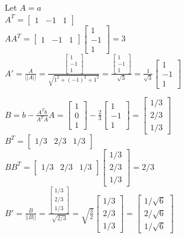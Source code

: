 \documentclass{article}
\begin{document}
\noindent
Let $A = a$\\
$A^T = \begin{bmatrix}1 & -1 & 1\end{bmatrix}$\\
$AA^T = \begin{bmatrix}1 & -1 & 1\end{bmatrix}\begin{bmatrix}1 \\ -1 \\ 1\end{bmatrix} = 3$ \\
$A' = \frac{A}{||A||} = \frac{\begin{bmatrix}1 \\ -1 \\ 1\end{bmatrix}}{\sqrt{1^2 + (-1)^2 + 1^2}} = \frac{\begin{bmatrix}1 \\ -1 \\ 1\end{bmatrix}}{\sqrt{3}} = \frac{1}{\sqrt{3}}\begin{bmatrix}1 \\ -1 \\ 1\end{bmatrix}$

\noindent
$B = b - \frac{A^Tb}{A^TA}A = \begin{bmatrix}1 \\ 0 \\ 1\end{bmatrix} - \frac{2}{3}\begin{bmatrix}1 \\ -1 \\ 1\end{bmatrix} = \begin{bmatrix}1/3 \\ 2/3 \\ 1/3\end{bmatrix}$ \\
$B^T = \begin{bmatrix}1/3 & 2/3 & 1/3\end{bmatrix}$ \\
$BB^T = \begin{bmatrix}1/3 & 2/3 & 1/3\end{bmatrix}\begin{bmatrix}1/3 \\ 2/3 \\ 1/3\end{bmatrix} = 2/3$ \\
$B' = \frac{B}{||B||} = \frac{\begin{bmatrix}1/3 \\ 2/3 \\ 1/3\end{bmatrix}}{\sqrt{2/3}} = \sqrt{\frac{3}{2}}\begin{bmatrix}1/3 \\ 2/3 \\ 1/3\end{bmatrix} = \begin{bmatrix}1/\sqrt{6} \\ 2/\sqrt{6} \\ 1/\sqrt{6}\end{bmatrix}$
\end{document}
